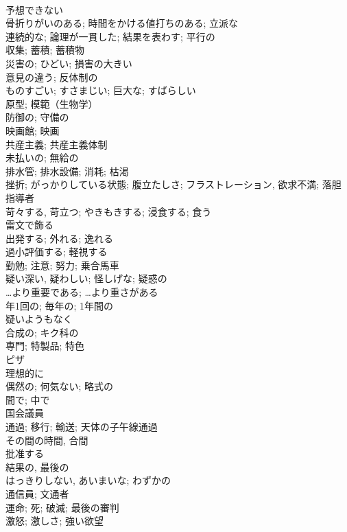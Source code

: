 \documentclass[8pt]{extreport}
\begin{document}
\begin{CJK}{UTF8}{min}
\\	予想できない	
\\	骨折りがいのある; 時間をかける値打ちのある; 立派な	
\\	連続的な; 論理が一貫した; 結果を表わす; 平行の	
\\	収集; 蓄積; 蓄積物	
\\	災害の; ひどい; 損害の大きい	
\\	意見の違う; 反体制の	
\\	ものすごい; すさまじい; 巨大な; すばらしい	
\\	原型; 模範（生物学）	
\\	防御の; 守備の	
\\	映画館; 映画	
\\	共産主義; 共産主義体制	
\\	未払いの; 無給の	
\\	排水管; 排水設備; 消耗; 枯渇	
\\	挫折; がっかりしている状態; 腹立たしさ; フラストレーション, 欲求不満; 落胆	
\\	指導者	
\\	苛々する, 苛立つ; やきもきする; 浸食する; 食う 
\\	雷文で飾る	
\\	出発する; 外れる; 逸れる	
\\	過小評価する; 軽視する	
\\	勤勉; 注意; 努力; 乗合馬車	
\\	疑い深い, 疑わしい; 怪しげな; 疑惑の	
\\	…より重要である; …より重さがある	
\\	年1回の; 毎年の; 1年間の	
\\	疑いようもなく	
\\	合成の; キク科の	
\\	専門; 特製品; 特色	
\\	ピザ	
\\	理想的に	
\\	偶然の; 何気ない; 略式の	
\\	間で; 中で	
\\	国会議員	
\\	通過; 移行; 輸送; 天体の子午線通過	
\\	その間の時間, 合間	
\\	批准する	
\\	結果の, 最後の	
\\	はっきりしない, あいまいな; わずかの	
\\	通信員; 文通者	
\\	運命; 死; 破滅; 最後の審判	
\\	激怒; 激しさ; 強い欲望	

\end{CJK}
\end{document}
